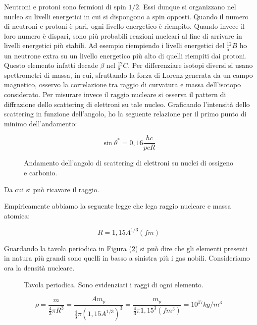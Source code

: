 Neutroni e protoni sono fermioni di spin $1/2$. Essi dunque si organizzano nel nucleo su livelli energetici in cui si dispongono a spin opposti.
Quando il numero di neutroni e protoni è pari, ogni livello energetico è riempito. Quando invece il loro numero è dispari, sono più probabili reazioni nucleari al fine di arrivare in livelli energetici più stabili. Ad esempio riempiendo i livelli energetici del $^{12}_5B$ ho un neutrone extra su un livello energetico più alto di quelli riempiti dai protoni. Questo elemento infatti decade $\beta$ nel $^{12}_6C$.
Per differenziare isotopi diversi si usano spettrometri di massa, in cui, sfruttando la forza di Lorenz generata da un campo magnetico, osservo la correlazione tra raggio di curvatura e massa dell'isotopo considerato.
Per misurare invece il raggio nucleare si osserva il pattern di diffrazione dello scattering di elettroni su tale nucleo. Graficando l'intensità dello scattering in funzione dell'angolo, ho la seguente relazione per il primo punto di minimo dell'andamento:

\begin{equation}
\sin \theta^*=0,16\frac{hc}{pcR}
\end{equation}

\begin{figure} []
\centering
		\caption{Andamento dell'angolo di scattering di elettroni su nuclei di ossigeno e carbonio.}
         \label{scatteringatomicradius}
\end{figure}

Da cui si può ricavare il raggio.

Empiricamente abbiamo la seguente legge che lega raggio nucleare e massa atomica:

\begin{equation}
R=1,15A^{1/3} (fm)
\end{equation}

Guardando la tavola periodica in Figura (\ref{atomicradii}) si può dire che gli elementi presenti in natura più grandi sono quelli in basso a sinistra più i gas nobili.
Consideriamo ora la densità nucleare. 

\begin{figure} []
\centering
		\caption{Tavola periodica. Sono evidenziati i raggi di ogni elemento.}
         \label{atomicradii}
\end{figure}

\begin{equation}
\rho=\frac{m}{\frac{4}{3}\pi R^3}=\frac{Am_p}{\frac{4}{3}\pi (1,15 A^{1/3})^3}=\frac{m_p}{\frac{4}{3}\pi 1,15^3 (fm^3)} = 10^{17} kg/m^3
\end{equation}

